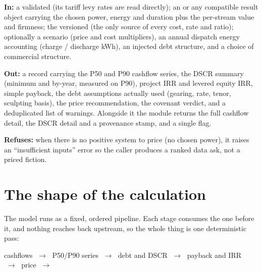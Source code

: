 
\begin{contract}
\textbf{In:} a validated  (its tariff levy rates are read directly); an  or any compatible result object carrying the chosen power, energy and duration plus the per-stream value and firmness; the versioned  (the only source of every cost, rate and ratio); optionally a scenario (price and cost multipliers), an annual dispatch energy accounting (charge / discharge kWh), an injected debt structure, and a choice of commercial structure.

\smallskip
\textbf{Out:} a  record carrying the P50 and P90 cashflow series, the DSCR summary (minimum and by-year, measured on P90), project IRR and levered equity IRR, simple payback, the debt assumptions actually used (gearing, rate, tenor, sculpting basis), the price recommendation, the covenant verdict, and a deduplicated list of warnings. Alongside it the module returns the full cashflow detail, the DSCR detail and a  provenance stamp, and a single  flag.

\smallskip
\textbf{Refuses:} when there is no positive system to price (no chosen power), it raises an ``insufficient inputs'' error so the caller produces a ranked data ask, not a priced fiction.
\end{contract}

\section{The shape of the calculation}

The model runs as a fixed, ordered pipeline. Each stage consumes the one before it, and nothing reaches back upstream, so the whole thing is one deterministic pass:

\begin{center}\sffamily\small
cashflows $\;\rightarrow\;$ P50/P90 series $\;\rightarrow\;$ debt and DSCR $\;\rightarrow\;$ payback and IRR $\;\rightarrow\;$ price $\;\rightarrow\;$ 
\end{center}

